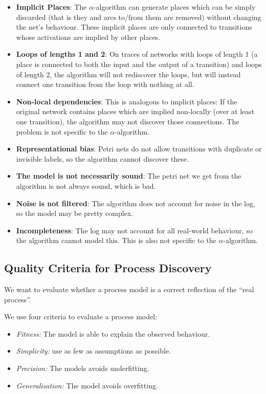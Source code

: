 \documentclass[english]{panikzettel}
\begin{document}
\begin{itemize}
    \item \textbf{Implicit Places}: The $\alpha$-algorithm can generate places which can be simply discarded (that is they and arcs to/from them are removed) without changing the net's behaviour.
    These implicit places are only connected to transitions whose activations are implied by other places.
    \item \textbf{Loops of lengths 1 and 2}: On traces of networks with loops of length 1 (a place is connected to both the input and the output of a transition) and loops of length 2, the algorithm will not rediscover the loops, but will instead connect one transition from the loop with nothing at all.
    \item \textbf{Non-local dependencies}: This is analogous to implicit places: If the original network contains places which are implied non-locally (over at least one transition), the algorithm may not discover those connections.
    The problem is not specific to the $\alpha$-algorithm.
    \item \textbf{Representational bias}: Petri nets do not allow transitions with duplicate or invisible labels, so the algorithm cannot discover these.
    \item \textbf{The model is not necessarily sound}: The petri net we get from the algorithm is not always sound, which is bad.
    \item \textbf{Noise is not filtered}: The algorithm does not account for noise in the log, so the model may be pretty complex.
    \item \textbf{Incompleteness}: The log may not account for all real-world behaviour, so the algorithm cannot model this. This is also not specific to the $\alpha$-algorithm.
\end{itemize}

\newpage

\subsection{Quality Criteria for Process Discovery}
We want to evaluate whether a process model is a correct reflection of the ``real process''.

We use four criteria to evaluate a process model:
\begin{itemize}
    \item \emph{Fitness:} The model is able to explain the observed behaviour.
    \item \emph{Simplicity:} use as few as assumptions as possible.
    \item \emph{Precision:} The models avoids underfitting.
    \item \emph{Generalisation:} The model avoids overfitting.
\end{itemize}
\end{document}
